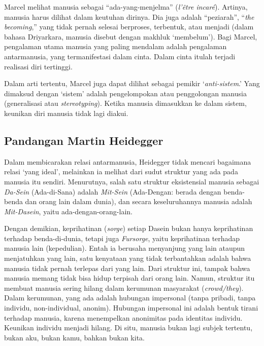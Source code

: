 \documentclass[11pt,twoside,a5paper,openany]{memoir}
\begin{document}
Marcel melihat manusia sebagai ``ada-yang-menjelma'' (\emph{l'être
incaré}). Artinya, manusia harus dilihat dalam keutuhan dirinya. Dia
juga adalah ``peziarah'', ``\emph{the becoming},'' yang tidak pernah
selesai berproses, terbentuk, atau menjadi (dalam bahasa Driyarkara,
manusia disebut dengan makhluk `membelum'). Bagi Marcel, pengalaman
utama manusia yang paling mendalam adalah pengalaman antarmanusia, yang
termanifestasi dalam cinta. Dalam cinta itulah terjadi realisasi diri
tertinggi.

Dalam arti tertentu, Marcel juga dapat dilihat sebagai pemikir
`\emph{anti-sistem}.' Yang dimaksud dengan `sistem' adalah pengelompokan
atau penggolongan manusia (generalisasi atau \emph{stereotyping}).
Ketika manusia dimasukkan ke dalam sistem, keunikan diri manusia tidak
lagi diakui.

\hypertarget{pandangan-martin-heidegger}{%
\subsection{Pandangan Martin
Heidegger}\label{pandangan-martin-heidegger}}

Dalam membicarakan relasi antarmanusia, Heidegger tidak mencari
bagaimana relasi `yang ideal', melainkan ia melihat dari sudut struktur
yang ada pada manusia itu sendiri. Menurutnya, salah satu struktur
eksistensial manusia sebagai \emph{Da-Sein} (Ada-di-Sana) adalah
\emph{Mit-Sein} (Ada-Dengan: berada dengan benda-benda dan orang lain
dalam dunia), dan secara keseluruhannya manusia adalah
\emph{Mit-Dasein}, yaitu ada-dengan-orang-lain.

Dengan demikian, keprihatinan (\emph{sorge}) setiap Dasein bukan hanya
keprihatinan terhadap benda-di-dunia, tetapi juga \emph{Fursorge}, yaitu
keprihatinan terhadap manusia lain (kepedulian). Entah ia berusaha
menyanjung yang lain ataupun menjatuhkan yang lain, satu kenyataan yang
tidak terbantahkan adalah bahwa manusia tidak pernah terlepas dari yang
lain. Dari struktur ini, tampak bahwa manusia memang tidak bisa hidup
terpisah dari orang lain. Namun, struktur itu membuat manusia sering
hilang dalam kerumunan masyarakat (\emph{crowd/they}). Dalam kerumunan,
yang ada adalah hubungan impersonal (tanpa pribadi, tanpa individu,
non-individual, anonim). Hubungan impersonal ini adalah bentuk tirani
terhadap manusia, karena menempelkan anonimitas pada identitas individu.
Keunikan individu menjadi hilang. Di situ, manusia bukan lagi subjek
tertentu, bukan aku, bukan kamu, bahkan bukan kita.
\end{document}
